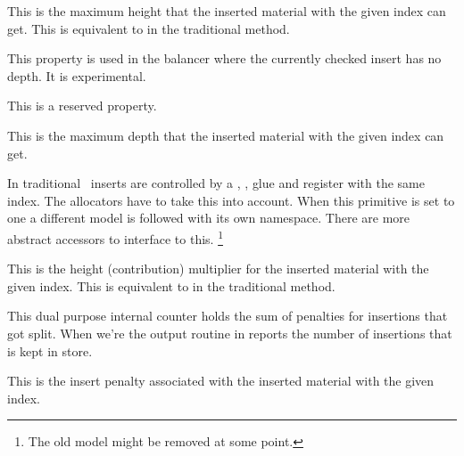 \startnewprimitive[title={\prm {insertlimit}}]

This is the maximum height that the inserted material with the given index can
get. This is equivalent to  in the traditional method.

\stopnewprimitive

\startnewprimitive[title={\prm {insertlinedepth}}]

This property is used in the balancer where the currently checked insert has no
depth. It is experimental.

\stopnewprimitive

\startnewprimitive[title={\prm {insertlineheight}}]

This is a reserved property.

\stopnewprimitive

\startnewprimitive[title={\prm {insertmaxdepth}}]

This is the maximum depth that the inserted material with the given index can
get.

\stopnewprimitive

\startnewprimitive[title={\prm {insertmode}}]

In traditional \TEX\ inserts are controlled by a , , \prm
{glue} and  register with the same index. The allocators have to take
this into account. When this primitive is set to one a different model is
followed with its own namespace. There are more abstract accessors to interface
to this. \footnote {The old model might be removed at some point.}

\stopnewprimitive

\startnewprimitive[title={\prm {insertmultiplier}}]

This is the height (contribution) multiplier for the inserted material with the
given index. This is equivalent to  in the traditional method.

\stopnewprimitive

\startoldprimitive[title={\prm {insertpenalties}}]

This dual purpose internal counter holds the sum of penalties for insertions that
got split. When we're the output routine in reports the number of insertions that
is kept in store.

\stopoldprimitive

\startnewprimitive[title={\prm {insertpenalty}}]

This is the insert penalty associated with the inserted material with the given
index.

